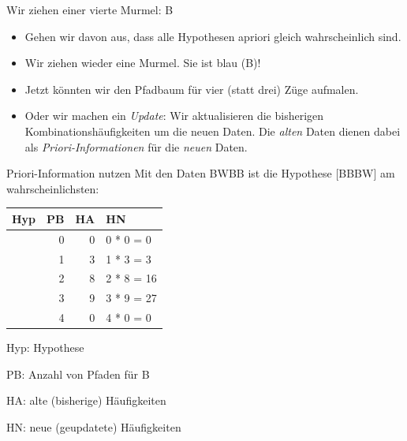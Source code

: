 \documentclass[
  ngerman,
  ignorenonframetext,
]{beamer}
\providecommand{\tightlist}{%
  \setlength{\itemsep}{0pt}\setlength{\parskip}{0pt}}
\begin{document}
\begin{frame}{Wir ziehen einer vierte Murmel: B}
\protect\hypertarget{wir-ziehen-einer-vierte-murmel-b}{}
\begin{itemize}
\tightlist
\item
  Gehen wir davon aus, dass alle Hypothesen apriori gleich
  wahrscheinlich sind.
\item
  Wir ziehen wieder eine Murmel. Sie ist blau (B)!
\item
  Jetzt könnten wir den Pfadbaum für vier (statt drei) Züge aufmalen.
\item
  Oder wir machen ein \emph{Update}: Wir aktualisieren die bisherigen
  Kombinationshäufigkeiten um die neuen Daten. Die \emph{alten} Daten
  dienen dabei als \emph{Priori-Informationen} für die \emph{neuen}
  Daten.
\end{itemize}
\end{frame}

\begin{frame}{Priori-Information nutzen}
\protect\hypertarget{priori-information-nutzen}{}
Mit den Daten BWBB ist die Hypothese {[}BBBW{]} am wahrscheinlichsten:

\begin{tabular}[t]{l|r|r|l}
\hline
Hyp & PB & HA & HN\\
\hline
[W W W W] & 0 & 0 & 0 * 0 = 0\\
\hline
[B W W W] & 1 & 3 & 1 * 3 = 3\\
\hline
[B B W W] & 2 & 8 & 2 * 8 = 16\\
\hline
[B B B W] & 3 & 9 & 3 * 9 = 27\\
\hline
[B B B B] & 4 & 0 & 4 * 0 = 0\\
\hline
\end{tabular}

Hyp: Hypothese

PB: Anzahl von Pfaden für B

HA: alte (bisherige) Häufigkeiten

HN: neue (geupdatete) Häufigkeiten
\end{frame}
\end{document}
